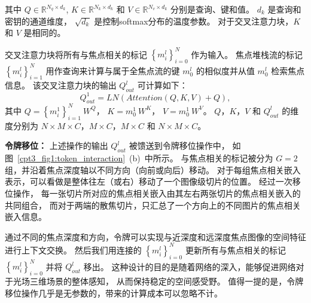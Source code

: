 %
%
其中
$ Q \in \mathbb{R}^{N_{q}\times d_{k}}  $,
$ K \in \mathbb{R}^{N_{k}\times d_{k}}  $ 和
$ V \in \mathbb{R}^{N_{v}\times d_{k}}  $ 
分别是查询、键和值。 
$ d_{k} $ 是查询和密钥的通道维度，
$ \sqrt{d_{k}} $ 是控制softmax分布的温度参数。 
对于交叉注意力块，$K$ 和 $V$ 是相同的。 
%
%
%
%
%
\par
%
%
%
%
交叉注意力块将所有与焦点相关的标记 $ \left \{ m_{i}^{l} \right \}_{i=0}^{N} $ 作为输入。 焦点堆栈流的标记 $ \left \{  m_{i}^{l} \right \}_{i=1}^{N} $ 用作查询来计算与属于全焦点流的键 $ m_{0}^{l} $ 的相似度并从值 $ m_{0}^{l} $ 检索焦点信息。 该交叉注意力块的输出 $ Q_{out}^{l} $ 可计算如下：
%
%
\begin{equation}
	Q_{out}^{1} = LN \left ( Attention(Q,K,V) + Q \right ),
\end{equation}
%
%
其中
$ Q = \left \{ m_{i}^{1} \right \}_{i=1}^{N}~ W^{Q}$，
$ K= m_{0}^{1} ~W^{K} $，
$ V =  m_{0}^{1}~ W^{V} $。
$ Q$，$K$，$V$ 和 $ Q_{out}^{l} $
的维度分别为 
$ N \times M \times C $，$ M \times C $，$ M \times C $ 
和
 $ N \times M \times C $。 
%
%
%
\par
%
%
%
\textbf{令牌移位：}
%
%
上述操作的输出 $ Q_{out}^{l} $ 被馈送到令牌移位操作中，
如图~\ref{cpt3_fig1:token_interaction}~(b)~中所示。 
与焦点相关的标记被分为 $G = 2$ 组，并沿着焦点深度轴以不同方向（向前或向后）移动。 
对于每组焦点相关嵌入表示，可以看做是整体往左（或右）移动了一个图像级切片的位置。
经过一次移位操作，
每一张切片所对应的焦点相关嵌入由其左右两张切片的焦点相关嵌入的共同组合，
而对于两端的散焦切片，只汇总了一个方向上的不同图片的焦点相关嵌入信息。
%
%
%
%
%
\par
%
%
通过不同的焦点深度和方向，令牌可以实现与近深度和远深度焦点图像的空间特征进行上下文交换。 
然后我们用连接的 $ \left \{ m_{i}^{l} \right \}_{i=0}^{N} $ 更新所有与焦点相关的标记  $ \left \{ m_{i}^{l} \right \}_{i=0}^{N} $ 并将 
$ Q_{out}^{l} $ 移出。 
%
%
%
%
%
%
这种设计的目的是随着网络的深入，能够促进网络对于光场三维场景的整体感知，
从而保持稳定的空间感受野。 
值得一提的是，令牌移位操作几乎是无参数的，带来的计算成本可以忽略不计。


